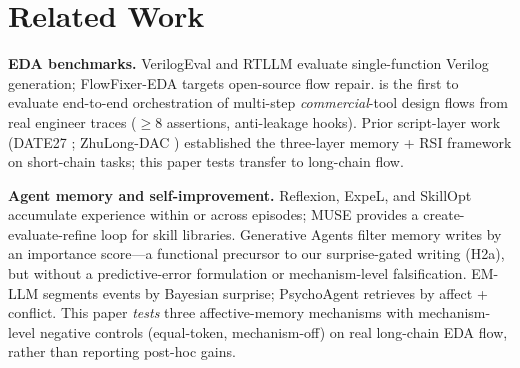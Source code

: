 \section{Related Work}
\label{sec:related}

\textbf{EDA benchmarks.} VerilogEval and RTLLM evaluate single-function Verilog generation; FlowFixer-EDA \cite{dong2026flowfixer} targets open-source flow repair. \bench{} is the first to evaluate end-to-end orchestration of multi-step \emph{commercial}-tool design flows from real engineer traces ($\geq$8 assertions, anti-leakage hooks). Prior script-layer work (DATE27 \cite{PLACEHOLDER_DATE27_ZHULONG}; ZhuLong-DAC \cite{liu2026runreadbackrefine}) established the three-layer memory + RSI framework on short-chain tasks; this paper tests transfer to long-chain flow.

{\sloppy \textbf{Agent memory and self-improvement.} Reflexion, ExpeL, and SkillOpt accumulate experience within or across episodes; MUSE provides a create-evaluate-refine loop for skill libraries. Generative Agents \cite{park2023} filter memory writes by an importance score---a functional precursor to our surprise-gated writing (H2a), but without a predictive-error formulation or mechanism-level falsification. EM-LLM segments events by Bayesian surprise; PsychoAgent retrieves by affect + conflict. This paper \emph{tests} three affective-memory mechanisms with mechanism-level negative controls (equal-token, mechanism-off) on real long-chain EDA flow, rather than reporting post-hoc gains.\par}

